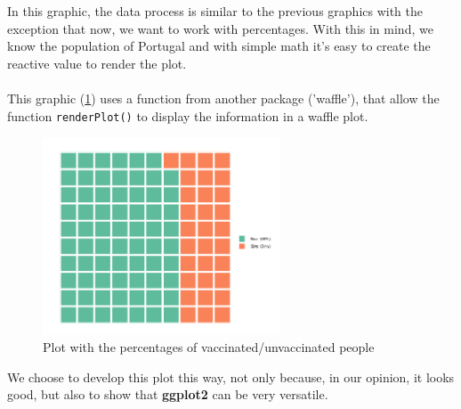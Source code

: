 In this graphic, the data process is similar to the previous graphics with the exception that now, we want to work with percentages. With this in mind, we know the population of Portugal and with simple math it's easy to create the reactive value to render the plot.\\
\\
This graphic (\ref{fig:ages-vac-6}) uses a function from another package ('waffle'), that allow the function \texttt{renderPlot()} to display the information in a waffle plot. 
\begin{figure}[H]
\centering
\includegraphics[width=200pt,trim=10 0 0 -10mm]{images/p6.png}
\caption{Plot with the percentages of vaccinated/unvaccinated people}
\label{fig:ages-vac-6}
\end{figure}
We choose to develop this plot this way, not only because, in our opinion, it looks good, but also to show that \textbf{ggplot2} can be very versatile.